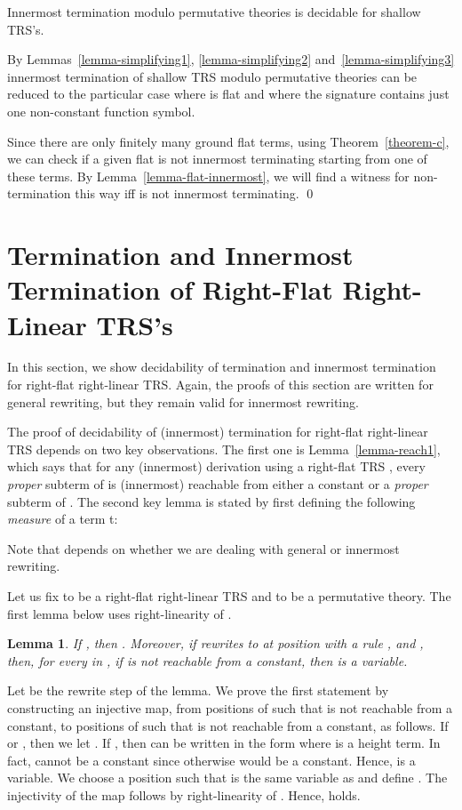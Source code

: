 \documentclass{LMCS}
\theoremstyle{plain}
\newtheorem{lemma}[thm]{Lemma}
\begin{document}
\begin{thm}\label{theorem-innermost}
Innermost termination modulo permutative theories is decidable
for shallow TRS's.
\end{thm}
\proof
By Lemmas~\ref{lemma-simplifying1}, \ref{lemma-simplifying2}
and~\ref{lemma-simplifying3}
innermost termination of shallow TRS modulo permutative theories can
be reduced to the particular case where  is flat
and where the signature contains just one non-constant function symbol.

Since there are only finitely many ground
flat terms, using Theorem~\ref{theorem-c}, we can check
if a given flat  is not innermost terminating starting from
one of these terms. By Lemma~\ref{lemma-flat-innermost},
we will find a witness for non-termination this way
iff  is not innermost terminating.
\qed



\section{Termination and Innermost Termination of Right-Flat Right-Linear TRS's}
\label{sec-right-flat-linear}

\noindent In this section, we show decidability of termination and
innermost termination for right-flat right-linear TRS.
Again, the proofs of this section are written for
general rewriting, but they remain valid for
innermost rewriting.

The proof of decidability of (innermost) termination for
right-flat right-linear TRS depends on two key
observations. The first one is Lemma~\ref{lemma-reach1},
which says that for any (innermost) derivation 
 using a right-flat TRS ,
every {\em proper} subterm of
 is (innermost) reachable from either a constant or a 
{\em proper} subterm of .
The second key lemma is stated by first
defining the following {\em measure} of a term t: 

Note that  depends on
whether we are dealing with general or innermost rewriting.

Let us fix  to be a right-flat right-linear TRS and
 to be a permutative theory.
The first lemma below uses right-linearity of .

\begin{lemma}\label{decreasing}
If , then .
Moreover, if  rewrites to 
at position  with a rule ,
and , then, for every  in ,
if  is not reachable from a constant, then
 is a variable.
\end{lemma}
\proof
Let  be the rewrite
step of the lemma.
We prove the first statement by constructing
an injective map, from positions  of 
such that  is not reachable from a constant, to
positions  of  such that  is not reachable
from a constant, as follows. If  or ,
then we let . If , then  can be written
in the form  where  is a height  term.
In fact,  cannot be a constant since otherwise
 would be a constant. Hence,  is a variable.
We choose a position  such that  is the
same variable as  and define . The injectivity
of the map follows by right-linearity of . Hence,
 holds.
\end{document}
